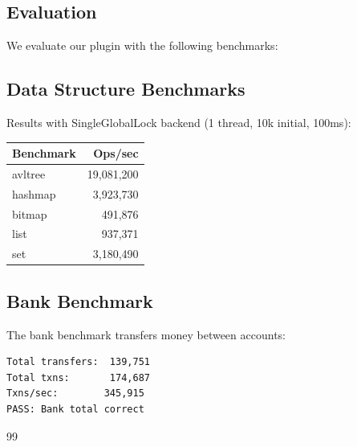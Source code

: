 \documentclass[article,12pt]{article}
\begin{document}
\begin{itemize}
\section{Evaluation}\label{sec:evaluation}

We evaluate our plugin with the following benchmarks:

\subsection{Data Structure Benchmarks}

Results with SingleGlobalLock backend (1 thread, 10k initial, 100ms):

\begin{table}[h]
\centering
\begin{tabular}{l|r}
Benchmark & Ops/sec\\\hline
avltree & 19,081,200\\
hashmap & 3,923,730\\
bitmap & 491,876\\
list & 937,371\\
set & 3,180,490\\
\end{tabular}
\end{table}

\subsection{Bank Benchmark}

The bank benchmark transfers money between accounts:

\begin{verbatim}
Total transfers:  139,751
Total txns:       174,687
Txns/sec:        345,915
PASS: Bank total correct
\end{verbatim}


\begin{thebibliography}{99}






\end{thebibliography}
\end{itemize}
\end{document}

